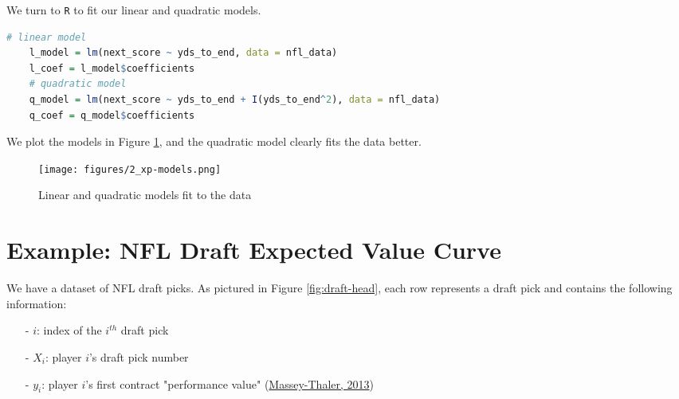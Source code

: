 \documentclass[twoside]{article}
\theoremstyle{definition}
\begin{document}
We turn to \texttt{R} to fit our linear and quadratic models.
\begin{lstlisting}[language=R]
    # linear model
    l_model = lm(next_score ~ yds_to_end, data = nfl_data)
    l_coef = l_model$coefficients
    # quadratic model
    q_model = lm(next_score ~ yds_to_end + I(yds_to_end^2), data = nfl_data)
    q_coef = q_model$coefficients
\end{lstlisting}
We plot the models in Figure \ref{fig:xp-models}, and the quadratic model clearly fits the data better.
\begin{figure}[H]
    \centering
    \texttt{[image: figures/2\_xp-models.png]}
    \caption{Linear and quadratic models fit to the data}
    \label{fig:xp-models}
\end{figure}

\section{Example: NFL Draft Expected Value Curve}

We have a dataset of NFL draft picks. As pictured in Figure \ref{fig:draft-head}, each row represents a draft pick and contains the following information:
\begin{itemize} 
    \item[-] $i$: index of the $i^{th}$ draft pick
    \item[-] $X_i$: player $i$'s draft pick number
    \item[-] $y_i$: player $i$'s first contract "performance value" (\href{https://faculty.wharton.upenn.edu/wp-content/uploads/2013/08/massey---thaler---losers-curse---management-science-july-2013.pdf}{Massey-Thaler, 2013})
\end{itemize}
\end{document}
